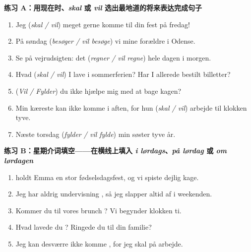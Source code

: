 \textbf{练习 A：用现在时、\textit{skal} 或 \textit{vil} 选出最地道的将来表达完成句子}
\begin{enumerate}
  \item Jeg \underline{\hspace{2.2cm}} (\textit{skal / vil}) meget gerne komme til din fest på fredag!
  \item På søndag \underline{\hspace{2.2cm}} (\textit{besøger / vil besøge}) vi mine forældre i Odense.
  \item Se på vejrudsigten: det \underline{\hspace{2.2cm}} (\textit{regner / vil regne}) hele dagen i morgen.
  \item Hvad \underline{\hspace{2.2cm}} (\textit{skal / vil}) I lave i sommerferien? Har I allerede bestilt billetter?
  \item \underline{\hspace{2.2cm}} (\textit{Vil / Fylder}) du ikke hjælpe mig med at bage kagen?
  \item Min kæreste kan ikke komme i aften, for hun \underline{\hspace{2.2cm}} (\textit{skal / vil}) arbejde til klokken tyve.
  \item Næste torsdag \underline{\hspace{2.2cm}} (\textit{fylder / vil fylde}) min søster tyve år.
\end{enumerate}

\textbf{练习 B：星期介词填空——在横线上填入 \textit{i lørdags}、\textit{på lørdag} 或 \textit{om lørdagen}}
\begin{enumerate}
  \item \underline{\hspace{2.5cm}} holdt Emma en stor fødselsdagsfest, og vi spiste dejlig kage.
  \item Jeg har aldrig undervisning \underline{\hspace{2.5cm}}, så jeg slapper altid af i weekenden.
  \item Kommer du til vores brunch \underline{\hspace{2.5cm}}? Vi begynder klokken ti.
  \item Hvad lavede du \underline{\hspace{2.5cm}}? Ringede du til din familie?
  \item Jeg kan desværre ikke komme \underline{\hspace{2.5cm}}, for jeg skal på arbejde.
\end{enumerate}

